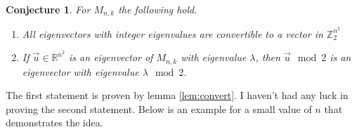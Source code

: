 \documentclass[12pt]{article}
\newtheorem{conjecture}{Conjecture}
\newcommand{\Z}{\mathbb{Z}}
\newcommand{\R}{\mathbb{R}}
\begin{document}
	\begin{conjecture}\label{conj:convertedeigval}
		For $M_{n,k}$ the following hold.
		\begin{enumerate}
			\item All eigenvectors with integer eigenvalues are convertible to a vector
			in $\Z_2^{n^2}$
			\item If $\vec{u} \in \R^{n^2}$ is an eigenvector of $M_{n,k}$ with
			eigenvalue $\lambda$,
			then $\vec{u} \mod 2$ is an eigenvector with eigenvalue $\lambda \mod 2$.
		\end{enumerate}
		
	\end{conjecture}
	The first statement is proven by lemma \ref{lem:convert}.
	I haven't had any luck in proving the second statement.
	Below is an example for a small value of $n$ that demonstrates the idea.
\end{document}
